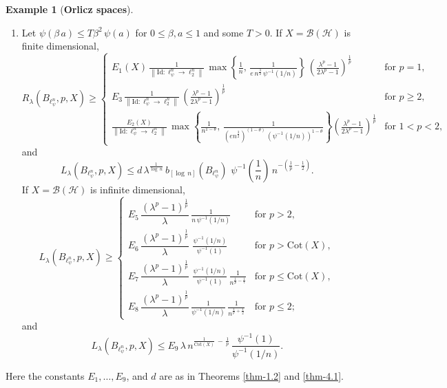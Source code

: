 \documentclass[a4paper,11pt, reqno]{amsart}
\theoremstyle{definition}
\newtheorem{example}{Example}[section]
\newcommand{\norm}[1]{\left\lVert#1\right\rVert}
\begin{document}
\begin{example} [{\bf Orlicz spaces}]
\begin{enumerate}
		\item Let $\psi(\beta \,a) \leq T \beta^2\,\psi(a)$ for $0 \leq \beta,a \leq 1$ and some $T>0$. If $X=\mathcal{B}(\mathcal{H})$ is finite dimensional,
		\begin{equation*}
			R_{\lambda}(B_{\ell^n_{\psi}}, p,X) \geq	\begin{cases}
				E_{1}(X)\,  \frac{1}{\norm{\mathrm{Id}:\ell^n_{\psi} \to \ell^n _2  }}\, \max \left\{\frac{1}{n}, \, \frac{1}{e\,n^{\frac{3}{2}}\, \psi^{-1}(1/n)}\right\}\, \left(\frac{\lambda^p -1}{2\lambda^p - 1}\right)^{\frac{1}{p}} & \text{for $p=1$}, \\[2mm]
				E_{3}\, \frac{1}{\norm{\mathrm{Id}:\ell^n_{\psi} \to \ell^n _2  }}\, \left(\frac{\lambda^p -1}{2\lambda^p - 1}\right)^{\frac{1}{p}}\, & \text{for $p \geq 2$}, \\[2mm]
				
				\frac{E_{2}(X)}{\norm{\mathrm{Id}:\ell^n_{\psi} \to \ell^n _2  }}\,  \max \left\{\frac{1}{n^{1-\theta}}, \, \frac{1}{(en^{\frac{3}{2}})^{(1-\theta)}\, (\psi^{-1}(1/n))^{1-\theta}}\right\}\left(\frac{\lambda^p -1}{2\lambda^p - 1}\right)^{\frac{1}{p}}  & \text{for $1<p< 2$}, 
			\end{cases}
		\end{equation*}
		and 
		$$L_{\lambda}(B_{\ell^n_{\psi}}, p,X) \leq d\,  \lambda^{\frac{1}{\log \,n}}\,b_{[\log\,n]}(B_{\ell^n_{\psi}})\,\,\psi^{-1}\left(\frac{1}{n}\right)\,  n^{-\left(\frac{1}{p}-\frac{1}{2}\right)}.$$
		If $X=\mathcal{B}(\mathcal{H})$ is infinite dimensional, 
		$$  L_{\lambda}(B_{\ell^n_{\psi}}, p,X) \geq \begin{cases}
			E_{5}\, \dfrac{\left(\lambda^p -1\right)^{\frac{1}{p}}}{\lambda}\, \frac{1}{n\, \psi^{-1}(1/n)} & \text{for $p > 2$}, \\[2mm]
			
			E_{6}\,\dfrac{\left(\lambda^p -1\right)^{\frac{1}{p}}}{\lambda}\, \,  \frac{\psi^{-1}(1/n)}{ \psi^{-1}(1)} & \text{for $p>\mathrm{Cot}(X)$}, \\[2mm]
			E_{7}\, \dfrac{\left(\lambda^p -1\right)^{\frac{1}{p}}}{\lambda}\,  \, \frac{\psi^{-1}(1/n)}{ \psi^{-1}(1)}\, \frac{ 1}{n^{\frac{1}{p}-\frac{1}{t}}} & \text{for $p\leq  \mathrm{Cot}(X)$},\\[2mm]
			E_{8}\, \dfrac{\left(\lambda^p -1\right)^{\frac{1}{p}}}{\lambda}\,   \frac{1}{\psi^{-1}(1/n)}\, \frac{1}{  n^{\frac{1}{p}+\frac{1}{2}}} & \text{for $p \leq 2$};
		\end{cases}$$
		and
		\begin{equation*}
			L_{\lambda}(B_{\ell^n_{\psi}}, p,X) \leq 	
			E_9\,\lambda\, n^{\frac{1}{\mathrm{Cot}(X)}\, - \,\frac{1}{p}} \, \frac{\psi^{-1}(1)}{ \psi^{-1}(1/n)}. 
		\end{equation*}
	\end{enumerate}
	Here the constants $E_1, \ldots, E_9$, and $d$ are as in Theorems \ref{thm-1.2} and \ref{thm-4.1}.
\end{example}
\end{document}
